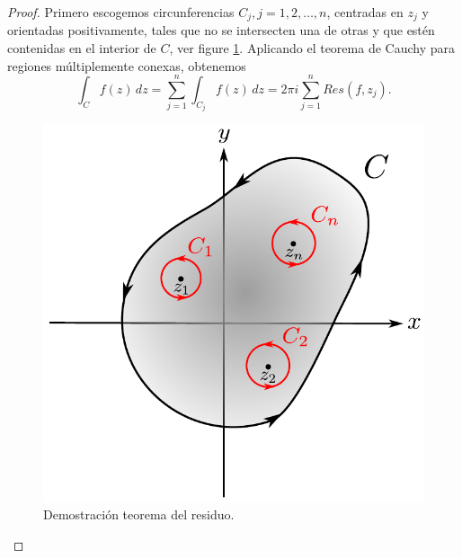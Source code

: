 \begin{proof}
Primero escogemos circunferencias $C_j, j = 1,2, \dots,n$, centradas en $z_j$ y orientadas positivamente, tales que no se intersecten una de otras y que estén contenidas en el interior de $C$, ver figure \ref{fig:TeoResiduo}. Aplicando el teorema de Cauchy para regiones múltiplemente conexas, obtenemos
$$\int_C f(z) \,dz = \sum_{j=1}^n \int_{C_j} f(z) \,dz = 2\pi i  \sum_{j=1}^n Res(f,z_j).$$

\begin{figure}[H]
    \centering
    \includegraphics[scale = 0.55]{Figuras/TeoremaResiduo.pdf}
    \caption{Demostración teorema del residuo.}
    \label{fig:TeoResiduo}
\end{figure}
\end{proof}

